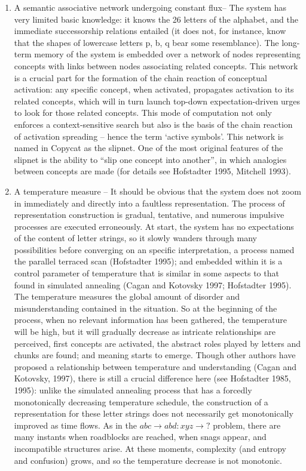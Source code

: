 \documentclass[a4paper]{article}
\begin{document}
\begin{enumerate}
\item A semantic associative network undergoing constant flux– The system has very limited basic knowledge: it knows the 26 letters of the alphabet, and the immediate successorship relations entailed (it does not, for instance, know that the shapes of lowercase letters p, b, q bear some resemblance).  The long-term memory of the system is embedded over a network of nodes representing concepts with links between nodes associating related concepts.  This network is a crucial part for the formation of the chain reaction of conceptual activation: any specific concept, when activated, propagates activation to its related concepts, which will in turn launch top-down expectation-driven urges to look for those related concepts. This mode of computation not only enforces a context-sensitive search but also is the basis of the chain reaction of activation spreading – hence the term ‘active symbols’.  This network is named in Copycat as the slipnet.    One of the most original features of the slipnet is the ability to “slip one concept into another”, in which analogies between concepts are made (for details see Hofstadter 1995, Mitchell 1993).  

\item A temperature measure – It should be obvious that the system does not zoom in immediately and directly into a faultless representation.  The process of representation construction is gradual, tentative, and numerous impulsive processes are executed erroneously.  At start, the system has no expectations of the content of letter strings, so it slowly wanders through many possibilities before converging on an specific interpretation, a process named the parallel terraced scan (Hofstadter 1995); and embedded within it is a control parameter of temperature that is similar in some aspects to that found in simulated annealing (Cagan and Kotovsky 1997; Hofstadter 1995).  The temperature measures the global amount of disorder and misunderstanding contained in the situation.  So at the beginning of the process, when no relevant information has been gathered, the temperature will be high, but it will gradually decrease as intricate relationships are perceived, first concepts are activated, the abstract roles played by letters and chunks are found; and meaning starts to emerge.  Though other authors have proposed a relationship between temperature and understanding (Cagan and Kotovsky, 1997), there is still a crucial difference here (see Hofstadter 1985, 1995): unlike the simulated annealing process that has a forcedly monotonically decreasing temperature schedule, the construction of a representation for these letter strings does not necessarily get monotonically improved as time flows.  As in the $abc\to abd : xyz\to ?$ problem, there are many instants when roadblocks are reached, when snags appear, and incompatible structures arise. At these moments, complexity (and entropy and confusion) grows, and so the temperature decrease is not monotonic.


\end{enumerate}
\end{document}
